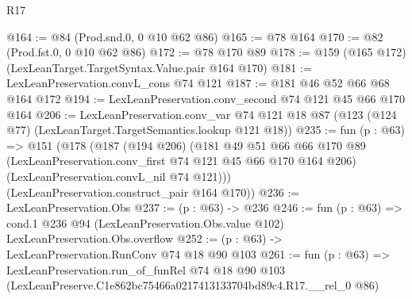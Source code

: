 \begin{lexlean}{R17}
\begin{coremodule}
@164 := @84 (Prod.snd.{0, 0} @10 @62 @86)
@165 := @78 @164
@170 := @82 (Prod.fst.{0, 0} @10 @62 @86)
@172 := @78 @170 @89
@178 := @159 (@165 @172) (LexLeanTarget.TargetSyntax.Value.pair @164 @170)
@181 := LexLeanPreservation.convL_cons @74 @121
@187 := @181 @46 @52 @66 @68 @164 @172
@194 := LexLeanPreservation.conv_second @74 @121 @45 @66 @170 @164
@206 := LexLeanPreservation.conv_var
    @74
    @121
    @18
    @87
    (@123 (@124 @77) (LexLeanTarget.TargetSemantics.lookup @121 @18))
@235 := fun (p : @63) =>
  @151
    (@178
      (@187
        (@194 @206)
        (@181
          @49
          @51
          @66
          @66
          @170
          @89
          (LexLeanPreservation.conv_first @74 @121 @45 @66 @170 @164 @206)
          (LexLeanPreservation.convL_nil @74 @121)))
      (LexLeanPreservation.construct_pair @164 @170))
@236 := LexLeanPreservation.Obs
@237 := (p : @63) -> @236
@246 := fun (p : @63) =>
  cond.{1} @236 @94 (LexLeanPreservation.Obs.value @102) LexLeanPreservation.Obs.overflow
@252 := (p : @63) -> LexLeanPreservation.RunConv @74 @18 @90 @103
@261 := fun (p : @63) =>
  LexLeanPreservation.run_of_funRel
    @74
    @18
    @90
    @103
    (LexLeanPreserve.C1e862bc75466a0217413133704bd89c4.R17.__rel_0 @86)
\end{coremodule}
\end{lexlean}
